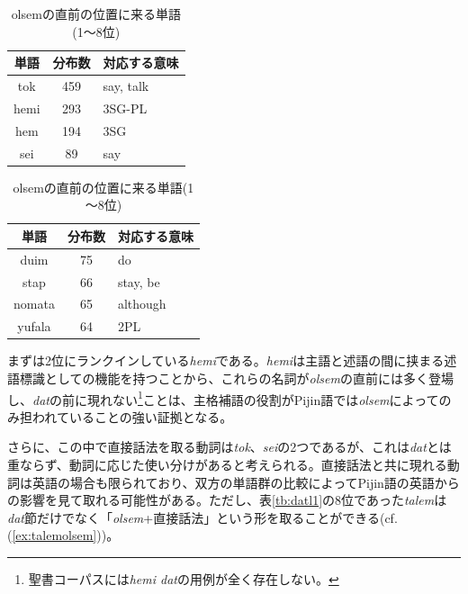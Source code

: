 \begin{table}[ht]
  \caption{olsemの直前の位置に来る単語(1～8位)}
  \label{tb:olseml1}
  \begin{minipage}{0.5\hsize}
  \begin{center}
    \begin{tabular}{|c||c|l|} \hline
      単語 & 分布数 & 対応する意味 \\ \hline \hline
      tok & 459 & say, talk\\ \hline
      hemi & 293 & 3SG-PL\\ \hline
      hem & 194 & 3SG\\ \hline
      sei & 89 & say\\ \hline
    \end{tabular}
  \end{center}
  \end{minipage}
  \begin{minipage}{0.5\hsize}
    \begin{center}
      \begin{tabular}{|c||c|l|} \hline
        単語 & 分布数 & 対応する意味 \\ \hline \hline
        duim & 75 & do \\ \hline
        stap & 66 & stay, be\\ \hline
        nomata & 65 & although\\ \hline
        yufala & 64 & 2PL\\ \hline
      \end{tabular}
    \end{center}
  \end{minipage}
\end{table}

まずは2位にランクインしている\textit{hemi}である。\textit{hemi}は主語と述語の間に挟まる述語標識としての機能を持つことから、これらの名詞が\textit{olsem}の直前には多く登場し、\textit{dat}の前に現れない\footnote{聖書コーパスには\textit{hemi dat}の用例が全く存在しない。}ことは、主格補語の役割がPijin語では\textit{olsem}によってのみ担われていることの強い証拠となる。

さらに、この中で直接話法を取る動詞は\textit{tok}、\textit{sei}の2つであるが、これは\textit{dat}とは重ならず、動詞に応じた使い分けがあると考えられる。直接話法と共に現れる動詞は英語の場合も限られており\citep[1024]{english}、双方の単語群の比較によってPijin語の英語からの影響を見て取れる可能性がある。ただし、表\ref{tb:datl1}の8位であった\textit{talem}は\textit{dat}節だけでなく「\textit{olsem}+直接話法」という形を取ることができる(cf. (\ref{ex:talemolsem}))。
